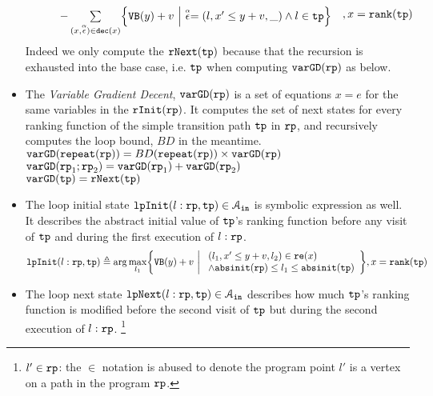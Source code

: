 \begin{defn}
\begin{itemize}
\[\begin{array}{l}
\begin{array}{l}
       \\ \qquad 
       - \sum\limits_{(x, \absevent) \in \dec(x) }\left\{ 
         \varinvar(y) + v ~\middle\vert~ \absevent = (l, x' \leq y + v, \_) \land l \in \tpath 
         \right\}
       \end{array}
     \end{array}
     , x = \locbound(\tpath)
   \]
   Indeed we only compute the $\mathtt{rNext}(\mathtt{tp})$ because that the recursion is exhausted into the base case, i.e. $\mathtt{tp}$ when computing $\mathtt{varGD}(\mathtt{rp})$ as below.
   \item  The \emph{Variable Gradient Decent}, 
   $\mathtt{varGD}(\mathtt{rp})$
   is a set of equations $x = e$ for the same variables in the $\mathtt{rInit}(\mathtt{rp})$.
   It computes the set of next states for every ranking function of the simple transition path $\mathtt{tp}$ in $\mathtt{rp}$,
   and recursively computes the loop bound, $BD$ in the meantime.
   \\
   {$\mathtt{varGD}(\mathtt{repeat}(\mathtt{rp})) =  BD(\mathtt{repeat}(\mathtt{rp})) \times {\ensuremath{\mathtt{varGD}}(\ensuremath{\mathtt{rp}})}$}
   \\
   $\mathtt{varGD}(\mathtt{rp}_1;\mathtt{rp}_2) =  \mathtt{varGD}(\mathtt{rp}_1)+ \mathtt{varGD}(\mathtt{rp}_2)$
   \\
   $\mathtt{varGD}(\mathtt{tp}) =  \mathtt{rNext}(\mathtt{tp})$   
%
   \item 
The loop initial state 
$\mathtt{lpInit}(l: \mathtt{rp}, \mathtt{tp}) \in \mathcal{A}_{\mathtt{in}}$ is symbolic expression as well. 
It describes the abstract initial value of $\mathtt{tp}$'s ranking function before
any visit of $\mathtt{tp}$ and during the first execution of $l: \mathtt{rp}$.
\[
  \lpinit(l: \rprog, \tpath) \triangleq 
  \arg\max_{l_1}\left\{
       \varinvar(y) + v ~\middle\vert~ 
       \begin{array}{l} 
         (l_1, x' \leq y + v, l_2) \in \reset(x) 
         \\
         \land \absinit(\rprog) \leq l_1 \leq \absinit(\tpath)
       \end{array}
     \right\}
    , x = \locbound(\tpath)
  \]
\item
The loop next state 
$\mathtt{lpNext}(l: \mathtt{rp}, \mathtt{tp}) \in \mathcal{A}_{\mathtt{in}}$ 
describes how much $\mathtt{tp}$'s ranking function
is modified before
the second visit of $\mathtt{tp}$ but during the second execution of $l: \mathtt{rp}$.
\footnote{$l' \in \mathtt{rp}$: the $\in$ notation is abused to denote
the program point $l'$ is a vertex on a path in the program $\mathtt{rp}$.}

\end{itemize}
\end{defn}
